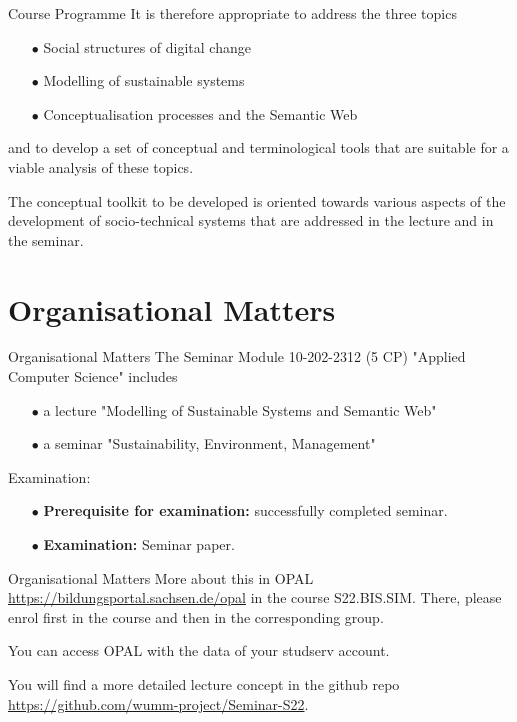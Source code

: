 \documentclass{beamer}
\begin{document}
\begin{frame}{Course Programme}
It is therefore appropriate to address the three topics
\begin{itemize}
\item[$\bullet$] Social structures of digital change
\item[$\bullet$] Modelling of sustainable systems
\item[$\bullet$] Conceptualisation processes and the Semantic Web
\end{itemize}
and to develop a set of conceptual and terminological tools that are suitable
for a viable analysis of these topics.

The conceptual toolkit to be developed is oriented towards various aspects of
the development of socio-technical systems that are addressed in the lecture
and in the seminar.
\end{frame}

\section{Organisational Matters}
\begin{frame}{Organisational Matters}
The Seminar Module 10-202-2312 (5 CP) "Applied Computer Science" includes
\begin{itemize}
\item[$\bullet$] a lecture "Modelling of Sustainable Systems and Semantic Web"
\item[$\bullet$] a seminar "Sustainability, Environment, Management"
\end{itemize}
Examination:
\begin{itemize}
\item[$\bullet$] \textbf{Prerequisite for examination:} successfully completed
  seminar.
\item[$\bullet$] \textbf{Examination:} Seminar paper.
\end{itemize}
\end{frame}

\begin{frame}{Organisational Matters}
More about this in OPAL \url{https://bildungsportal.sachsen.de/opal} in the
course S22.BIS.SIM.  There, please enrol first in the course and then in the
corresponding group.

You can access OPAL with the data of your studserv account.

You will find a more detailed lecture concept in the github repo
\url{https://github.com/wumm-project/Seminar-S22}.
\end{frame}
\end{document}
